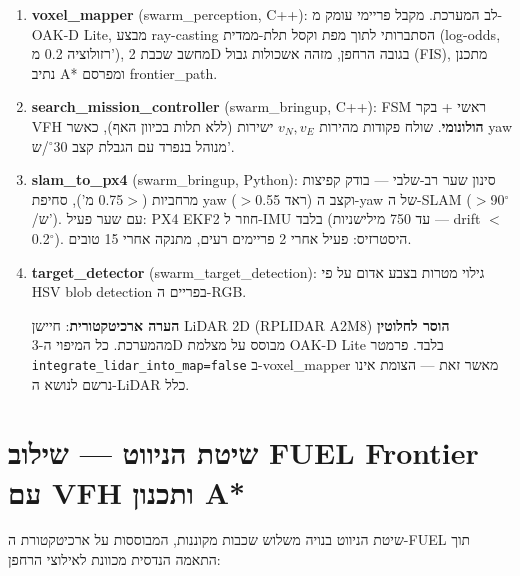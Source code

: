 \documentclass[11pt,a4paper]{article}
\begin{document}
\begin{enumerate}
    \item \textbf{\textenglish{voxel\_mapper}} (\textenglish{swarm\_perception, C++}): לב המערכת. מקבל פריימי עומק מ-\textenglish{OAK-D Lite}, מבצע \textenglish{ray-casting} הסתברותי לתוך מפת וקסל תלת-ממדית (\textenglish{log-odds}, רזולוציה 0.2 מ'), מחשב שכבת 2D בגובה הרחפן, מזהה אשכולות גבול (\textenglish{FIS}), מתכנן נתיב \textenglish{A*} ומפרסם \textenglish{frontier\_path}.

    \item \textbf{\textenglish{search\_mission\_controller}} (\textenglish{swarm\_bringup, C++}): \textenglish{FSM} ראשי + בקר \textenglish{VFH} \textbf{הולונומי}. שולח פקודות מהירות $v_N, v_E$ ישירות (ללא תלות בכיוון האף), כאשר \textenglish{yaw} מנוהל בנפרד עם הגבלת קצב 30$^{\circ}$/ש'.

    \item \textbf{\textenglish{slam\_to\_px4}} (\textenglish{swarm\_bringup, Python}): סינון שער רב-שלבי — בודק קפיצות מרחביות ($>$0.75 מ'), סחיפת \textenglish{yaw} ($>$0.55 ראד) וקצב ה-\textenglish{yaw} של ה-\textenglish{SLAM} ($>$90$^{\circ}$/ש'). עם שער פעיל: \textenglish{PX4 EKF2} חוזר ל-\textenglish{IMU} בלבד (עד 750 מילישניות — drift $<$0.2$^{\circ}$). היסטרזיס: פעיל אחרי 2 פריימים רעים, מתנקה אחרי 15 טובים.

    \item \textbf{\textenglish{target\_detector}} (\textenglish{swarm\_target\_detection}): גילוי מטרות בצבע אדום על פי \textenglish{HSV blob detection} בפריים ה-\textenglish{RGB}.

    \textbf{הערה ארכיטקטורית}: חיישן \textenglish{LiDAR} 2D (\textenglish{RPLIDAR A2M8}) \textbf{הוסר לחלוטין} מהמערכת. כל המיפוי ה-3D מבוסס על מצלמת \textenglish{OAK-D Lite} בלבד. פרמטר \texttt{integrate\_lidar\_into\_map=false} ב-\textenglish{voxel\_mapper} מאשר זאת — הצומת אינו נרשם לנושא ה-\textenglish{LiDAR} כלל.
\end{enumerate}

\section{שיטת הניווט — שילוב \textenglish{FUEL Frontier} עם \textenglish{VFH} ותכנון \textenglish{A*}}

שיטת הניווט בנויה משלוש שכבות מקוננות, המבוססות על ארכיטקטורת ה-\textenglish{FUEL} תוך התאמה הנדסית מכוונת לאילוצי הרחפן:
\end{document}
